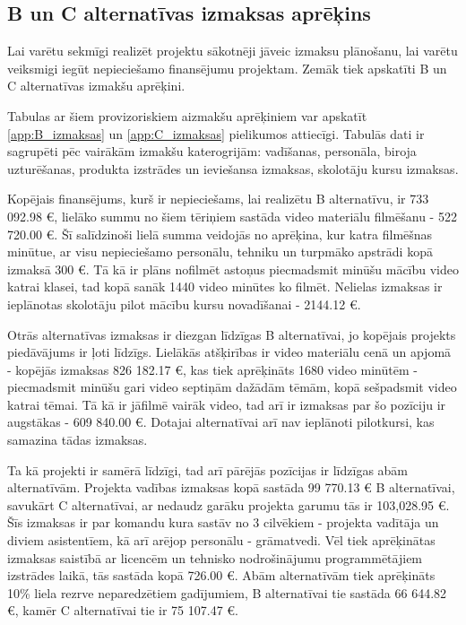 \subsection{B un C alternatīvas izmaksas aprēķins}
Lai varētu sekmīgi realizēt projektu sākotnēji jāveic izmaksu plānošanu, lai
varētu veiksmigi iegūt nepieciešamo finansējumu projektam. Zemāk tiek apskatīti
B un C alternatīvas izmakšu aprēķini.
\par
Tabulas ar šiem provizoriskiem aizmakšu aprēķiniem var apskatīt \ref{app:B_izmaksas} un \ref{app:C_izmaksas}
pielikumos attiecīgi. Tabulās dati ir sagrupēti pēc vairākām izmakšu katerogrijām: vadīšanas,
personāla, biroja uzturēšanas, produkta izstrādes un ieviešansa izmaksas, skolotāju kursu izmaksas. 
\par
Kopējais finansējums, kurš ir nepieciešams, lai realizētu B alternatīvu, ir 733 092.98 €, lielāko
summu no šiem tēriņiem sastāda video materiālu filmēšanu - 522 720.00 €. Šī salīdzinoši lielā summa
veidojās no aprēķina, kur katra filmēšnas minūtue, ar visu nepieciešamo personālu, tehniku un turpmāko
apstrādi kopā izmaksā 300 €. Tā kā ir plāns nofilmēt astoņus piecmadsmit minūšu mācību video katrai
klasei, tad kopā sanāk 1440 video minūtes ko filmēt. Nelielas izmaksas ir ieplānotas skolotāju pilot 
mācību kursu novadīšanai - 2144.12 €. 
\par
Otrās alternatīvas izmaksas ir diezgan līdzīgas B alternatīvai, jo kopējais projekts piedāvājums ir ļoti
līdzīgs. Lielākās atšķirības ir video materiālu cenā un apjomā - kopējās izmaksas 826 182.17 €, kas tiek
aprēķināts 1680 video minūtēm - piecmadsmit minūšu gari video septiņām dažādām tēmām, kopā sešpadsmit
video katrai tēmai. Tā kā ir jāfilmē vairāk video, tad arī ir izmaksas par šo pozīciju ir augstākas - 
609 840.00 €. Dotajai alternatīvai arī nav ieplānoti pilotkursi, kas samazina tādas izmaksas.
\par
Ta kā projekti ir samērā līdzīgi, tad arī pārējās pozīcijas ir līdzīgas abām alternatīvām.
Projekta vadības izmaksas kopā sastāda 99 770.13 € B alternatīvai, savukārt C alternatīvai, 
ar nedaudz garāku projekta garumu tās ir 103,028.95 €. Šīs izmaksas ir par komandu kura sastāv 
no 3 cilvēkiem - projekta vadītāja un diviem asistentīem, kā arī arējop personālu - grāmatvedi. Vēl 
tiek aprēķinātas izmaksas saistībā ar licencēm un tehnisko nodrošinājumu programmētājiem izstrādes laikā,
tās sastāda kopā 726.00 €. Abām alternatīvām tiek aprēķināts 10\% liela rezrve neparedzētiem gadījumiem,
B alternatīvai tie sastāda 66 644.82 €, kamēr C alternatīvai tie ir 75 107.47 €. 
